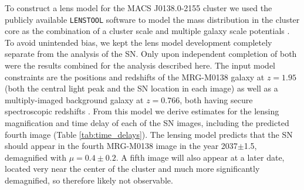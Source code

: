 \documentclass[12pt,dvipsnames]{article}
\def\lenstool{{\tt LENSTOOL}\xspace}
\begin{document}
To construct a lens model for the MACS J0138.0-2155 cluster we used the publicly available \lenstool software \cite{jullo_bayesian_2007, kneib_lenstool_2011} to model the mass distribution in the cluster core as the combination of a cluster scale and multiple galaxy scale potentials \cite{materials_methods_2020}.  To avoid unintended bias, we kept the lens model development completely separate from the analysis of the SN.  Only upon independent completion of both were the results combined for the analysis described here.  The input model constraints are the positions and redshifts of the MRG-M0138 galaxy at $z=1.95$ (both the central light peak and the SN location in each image) as well as a multiply-imaged background 
galaxy at $z=0.766$, both having secure spectroscopic redshifts \cite{materials_methods_2020}.  
From this model we derive estimates for the lensing magnification and time delay of each of the SN images, including the predicted fourth image (Table \ref{tab:time_delays}).
The lensing model predicts that the SN should appear in the fourth MRG-M0138 image in the year 2037$\pm$1.5, demagnified with $\mu=0.4\pm0.2$. A fifth image will also appear at a later date, located very near the center of the cluster and much more significantly demagnified, so therefore likely not observable.  
 
\end{document}
